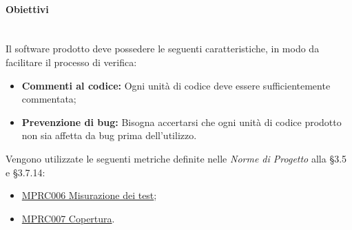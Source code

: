 \paragraph{Obiettivi}\mbox{}\\[0.4cm]
Il software prodotto deve possedere le seguenti caratteristiche, in modo da facilitare il processo di verifica:
\begin{itemize}
	\item \textbf{Commenti al codice:} Ogni unità di codice deve essere sufficientemente commentata;
	\item \textbf{Prevenzione di bug:} Bisogna accertarsi che ogni unità di codice prodotto non sia affetta da bug prima dell'utilizzo.
\end{itemize}
Vengono utilizzate le seguenti metriche definite nelle \textit{Norme di Progetto} alla §3.5 e §3.7.14:
\begin{itemize}
	\item \label{metrica_processo_MPRC006}\hyperref[sec:qprocesso_tabella_metriche_sw_obiettivi_MPRC006]{MPRC006 Misurazione dei test};
	\item \label{metrica_processo_MPRC007}\hyperref[sec:qprocesso_tabella_metriche_sw_obiettivi_MPRC007]{MPRC007 Copertura}.
\end{itemize}


